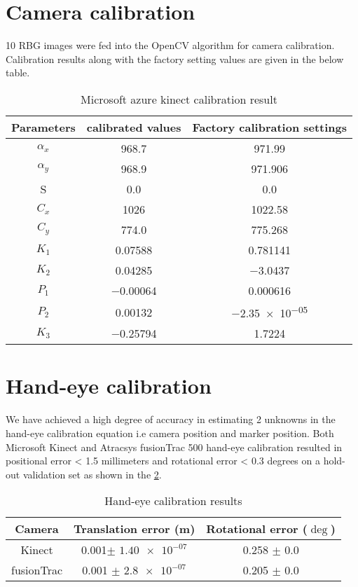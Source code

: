 \section{Camera calibration} 10 RBG images were fed into the OpenCV algorithm for camera calibration. Calibration results along with the factory setting values are given in the below table.

\begin{table}[hbt]
	\centering
	\begin{tabular}{|c|c|c|}
		\hline
		Parameters & calibrated values & Factory calibration settings\\ 
		\hline
		$\alpha_x$  & \num{968.7}  & \num{971.99}\\
		$\alpha_y$ & \num{968.9} & \num{971.906}\\
		S & 0.0 & 0.0\\
		$C_x$ & \num{1026} & \num{1022.58} \\
		$C_y$ & \num{774.0} & \num{775.268} \\
		$K_1$ & \num{0.07588} & \num{0.781141} \\
		$K_2$ & \num{0.04285}  & \num{-3.0437}\\
		$P_1$ & \num{-0.00064} & \num{0.000616}\\
		$P_2$ & \num{0.00132}  & \num{-2.35e-05} \\
		$K_3$ & \num{-0.25794} & \num{1.7224} \\
		\hline
	\end{tabular}
	\caption{Microsoft azure kinect calibration result}
	\label{tab:kinect_camera_calibration_result}
\end{table}

\section{Hand-eye calibration}

We have achieved a high degree of accuracy in estimating 2 unknowns in the hand-eye calibration equation i.e camera position and marker position. Both Microsoft Kinect and Atracsys fusionTrac 500 hand-eye calibration resulted in positional error < 1.5 millimeters and rotational error < 0.3 degrees on a hold-out validation set as shown in the \cref{tab:kinect__fusionTrac_handeye_result}.

\begin{table}[hbt!]
	\centering
	\begin{tabular}{|c|c|c|}
		\hline
		Camera & Translation error (m) & Rotational error ($\deg$)\\ 
		\hline
		Kinect & 0.001$\pm$ $\num{1.40e-07}$  & 0.258 $\pm$ $\num{0.0}$\\
		fusionTrac & 0.001 $\pm$ $\num{2.8e-07}$  & 0.205 $\pm$ $\num{0.0}$\\
		\hline
	\end{tabular}
	\caption{Hand-eye calibration results}
	\label{tab:kinect__fusionTrac_handeye_result}
\end{table}

